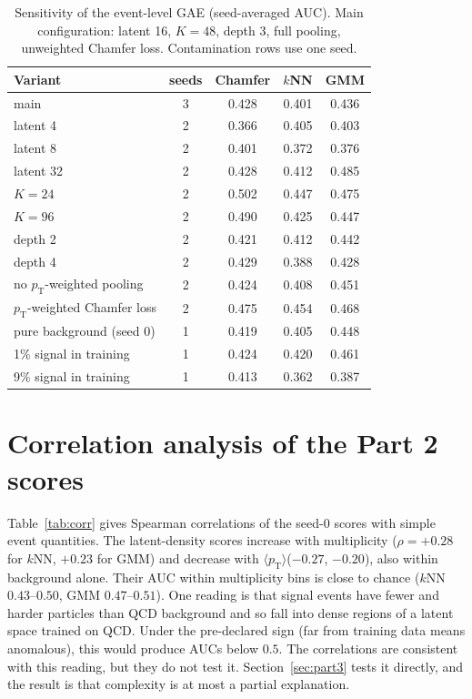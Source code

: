 \documentclass[11pt,a4paper]{article}
\newcommand{\pt}{\ensuremath{p_\mathrm{T}}\xspace}
\newcommand{\ptmean}{\ensuremath{\langle \pt \rangle}\xspace}
\begin{document}
\begin{table}[t]
\centering
\caption{Sensitivity of the event-level GAE (seed-averaged AUC). Main configuration: latent 16,
$K=48$, depth 3, full pooling, unweighted Chamfer loss. Contamination rows use one seed.}
\label{tab:ablation}
\begin{tabular}{lcccc}
\toprule
Variant & seeds & Chamfer & $k$NN & GMM \\
\midrule
main                           & 3 & 0.428 & 0.401 & 0.436 \\
latent 4                       & 2 & 0.366 & 0.405 & 0.403 \\
latent 8                       & 2 & 0.401 & 0.372 & 0.376 \\
latent 32                      & 2 & 0.428 & 0.412 & 0.485 \\
$K=24$                         & 2 & 0.502 & 0.447 & 0.475 \\
$K=96$                         & 2 & 0.490 & 0.425 & 0.447 \\
depth 2                        & 2 & 0.421 & 0.412 & 0.442 \\
depth 4                        & 2 & 0.429 & 0.388 & 0.428 \\
no \pt-weighted pooling        & 2 & 0.424 & 0.408 & 0.451 \\
\pt-weighted Chamfer loss      & 2 & 0.475 & 0.454 & 0.468 \\
\midrule
pure background (seed 0)       & 1 & 0.419 & 0.405 & 0.448 \\
1\% signal in training         & 1 & 0.424 & 0.420 & 0.461 \\
9\% signal in training         & 1 & 0.413 & 0.362 & 0.387 \\
\bottomrule
\end{tabular}
\end{table}

\section{Correlation analysis of the Part 2 scores}
\label{sec:diagnosis}

Table~\ref{tab:corr} gives Spearman correlations of the seed-0 scores with simple event
quantities. The latent-density scores increase with multiplicity ($\rho=+0.28$ for $k$NN,
$+0.23$ for GMM) and decrease with \ptmean ($-0.27$, $-0.20$), also within background alone. Their
AUC within multiplicity bins is close to chance ($k$NN $0.43$--$0.50$, GMM $0.47$--$0.51$).
One reading is that signal events have fewer and harder particles than QCD background and so fall
into dense regions of a latent space trained on QCD. Under the pre-declared sign (far from training data
means anomalous), this would produce AUCs below $0.5$. The correlations are consistent with this
reading, but they do not test it. Section~\ref{sec:part3} tests it directly, and the result is that
complexity is at most a partial explanation.
\end{document}
